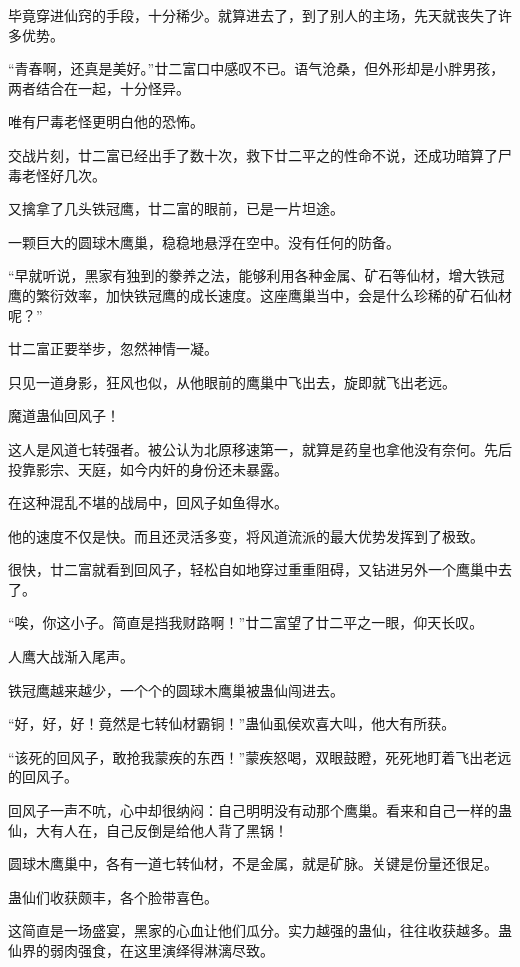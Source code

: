 \begin{this_body}
毕竟穿进仙窍的手段，十分稀少。就算进去了，到了别人的主场，先天就丧失了许多优势。

“青春啊，还真是美好。”廿二富口中感叹不已。语气沧桑，但外形却是小胖男孩，两者结合在一起，十分怪异。

唯有尸毒老怪更明白他的恐怖。

交战片刻，廿二富已经出手了数十次，救下廿二平之的性命不说，还成功暗算了尸毒老怪好几次。

又擒拿了几头铁冠鹰，廿二富的眼前，已是一片坦途。

一颗巨大的圆球木鹰巢，稳稳地悬浮在空中。没有任何的防备。

“早就听说，黑家有独到的豢养之法，能够利用各种金属、矿石等仙材，增大铁冠鹰的繁衍效率，加快铁冠鹰的成长速度。这座鹰巢当中，会是什么珍稀的矿石仙材呢？”

廿二富正要举步，忽然神情一凝。

只见一道身影，狂风也似，从他眼前的鹰巢中飞出去，旋即就飞出老远。

魔道蛊仙回风子！

这人是风道七转强者。被公认为北原移速第一，就算是药皇也拿他没有奈何。先后投靠影宗、天庭，如今内奸的身份还未暴露。

在这种混乱不堪的战局中，回风子如鱼得水。

他的速度不仅是快。而且还灵活多变，将风道流派的最大优势发挥到了极致。

很快，廿二富就看到回风子，轻松自如地穿过重重阻碍，又钻进另外一个鹰巢中去了。

“唉，你这小子。简直是挡我财路啊！”廿二富望了廿二平之一眼，仰天长叹。

人鹰大战渐入尾声。

铁冠鹰越来越少，一个个的圆球木鹰巢被蛊仙闯进去。

“好，好，好！竟然是七转仙材霸铜！”蛊仙虱侯欢喜大叫，他大有所获。

“该死的回风子，敢抢我蒙疾的东西！”蒙疾怒喝，双眼鼓瞪，死死地盯着飞出老远的回风子。

回风子一声不吭，心中却很纳闷：自己明明没有动那个鹰巢。看来和自己一样的蛊仙，大有人在，自己反倒是给他人背了黑锅！

圆球木鹰巢中，各有一道七转仙材，不是金属，就是矿脉。关键是份量还很足。

蛊仙们收获颇丰，各个脸带喜色。

这简直是一场盛宴，黑家的心血让他们瓜分。实力越强的蛊仙，往往收获越多。蛊仙界的弱肉强食，在这里演绎得淋漓尽致。


\end{this_body}
